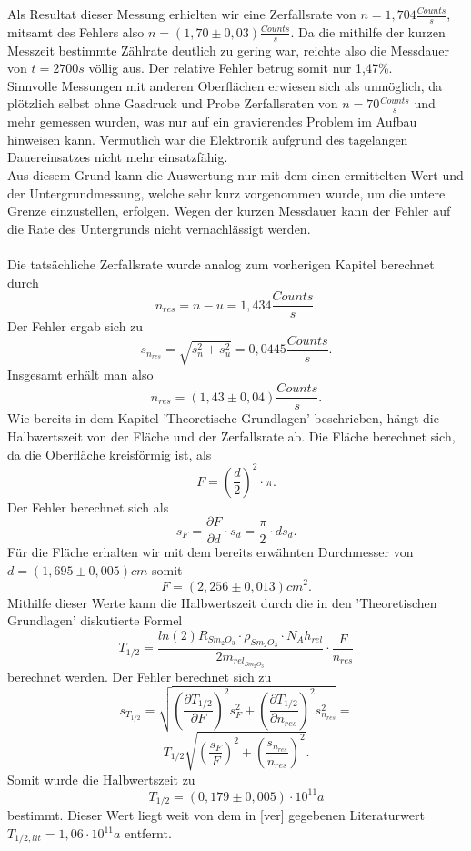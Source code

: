   Als Resultat dieser Messung erhielten wir eine Zerfallsrate von $n=1,704\frac{Counts}{s}$, mitsamt des Fehlers also $n=(1,70\pm0,03)\frac{Counts}{s}$. Da die mithilfe der kurzen Messzeit bestimmte Zählrate deutlich zu gering war, reichte also die Messdauer von $t=2700 s$ völlig aus. Der relative Fehler betrug somit nur 1,47\%.\\
  Sinnvolle Messungen mit anderen Oberflächen erwiesen sich als unmöglich, da plötzlich selbst ohne Gasdruck und Probe Zerfallsraten von $n=70\frac{Counts}{s}$ und mehr gemessen wurden, was nur auf ein gravierendes Problem im Aufbau hinweisen kann. Vermutlich war die Elektronik aufgrund des tagelangen Dauereinsatzes nicht mehr einsatzfähig.\\
  Aus diesem Grund kann die Auswertung nur mit dem einen ermittelten Wert und der Untergrundmessung, welche sehr kurz vorgenommen wurde, um die untere Grenze einzustellen, erfolgen. Wegen der kurzen Messdauer kann der Fehler auf die Rate des Untergrunds nicht vernachlässigt werden. \\
  ~\\
  Die tatsächliche Zerfallsrate wurde analog zum vorherigen Kapitel berechnet durch \[n_{res}=n-u=1,434\frac{Counts}{s}.\] 
  Der Fehler ergab sich zu \[s_{n_{res}}=\sqrt{s_{n}^{2}+s_{u}^{2}}=0,0445\frac{Counts}{s}.\]
  Insgesamt erhält man also \[n_{res}=(1,43\pm0,04)\frac{Counts}{s}.\]
  Wie bereits in dem Kapitel 'Theoretische Grundlagen' beschrieben, hängt die Halbwertszeit von der Fläche und der Zerfallsrate ab. Die Fläche berechnet sich, da die Oberfläche kreisförmig ist, als \[F=\left(\frac{d}{2}\right)^{2}\cdot\pi.\] Der Fehler berechnet sich als \[s_{F}=\frac{\partial F}{\partial d}\cdot s_{d}=\frac{\pi}{2}\cdot d s_{d}.\]
  Für die Fläche erhalten wir mit dem bereits erwähnten Durchmesser von $d=(1,695\pm0,005)cm$ somit \[F=(2,256\pm0,013)cm^{2}.\] 
  Mithilfe dieser Werte kann die Halbwertszeit durch die in den 'Theoretischen Grundlagen' diskutierte Formel \[T_{1/2}=\frac{ln(2)R_{Sm_{2}O_{3}}\cdot\rho_{Sm_{2}O_{3}}\cdot N_{A}h_{rel}}{2m_{rel_{Sm_{2}O_{3}}}}\cdot\frac{F}{n_{res}}\] berechnet werden. Der Fehler berechnet sich zu
   \[s_{T_{1/2}}=\sqrt{\left(\frac{\partial T_{1/2}}{\partial F}\right)^{2}s_{F}^{2}+\left(\frac{\partial T_{1/2}}{\partial n_{res}}\right)^{2}s_{n_{res}}^{2}}=\]
   \[T_{1/2}\sqrt{\left(\frac{s_{F}}{F}\right)^{2}+\left(\frac{s_{n_{res}}}{n_{res}}\right)^{2}}.\] 
   Somit wurde die Halbwertszeit zu \[T_{1/2}=(0,179\pm0,005)\cdot10^{11}a\] bestimmt. Dieser Wert liegt weit von dem in [ver] gegebenen Literaturwert $T_{1/2,lit}=1,06\cdot10^{11}a$ entfernt.\\
